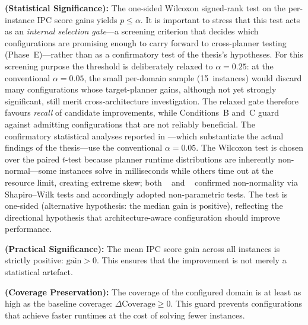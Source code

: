 \begin{description}[style=nextline, leftmargin=2.5cm, labelwidth=2.2cm]
  \item[\textbf{Condition~A}] \textbf{(Statistical Significance):}
        The one-sided Wilcoxon signed-rank test on the per-instance IPC score gains yields $p \leq \alpha$.
        It is important to stress that this test acts as an \emph{internal selection gate}---a screening criterion that decides which configurations are promising enough to carry forward to cross-planner testing (Phase~E)---rather than as a confirmatory test of the thesis's hypotheses.
        For this screening purpose the threshold is deliberately relaxed to $\alpha = 0.25$: at the conventional $\alpha = 0.05$, the small per-domain sample (15~instances) would discard many configurations whose target-planner gains, although not yet strongly significant, still merit cross-architecture investigation.
        The relaxed gate therefore favours \emph{recall} of candidate improvements, while Conditions~B and~C guard against admitting configurations that are not reliably beneficial.
        The confirmatory statistical analyses reported in ---which substantiate the actual findings of the thesis---use the conventional $\alpha = 0.05$.
        The Wilcoxon test is chosen over the paired $t$-test because planner runtime distributions are inherently non-normal---some instances solve in milliseconds while others time out at the resource limit, creating extreme skew; both \citeauthor{Elis2025}~\cite{Elis2025} and \citeauthor{Georgievski2025}~\cite{Georgievski2025} confirmed non-normality via Shapiro--Wilk tests and accordingly adopted non-parametric tests.
        The test is one-sided (alternative hypothesis: the median gain is positive), reflecting the directional hypothesis that architecture-aware configuration should improve performance.

  \item[\textbf{Condition~B}] \textbf{(Practical Significance):}
        The mean IPC score gain across all instances is strictly positive: $\overline{\text{gain}} > 0$.
        This ensures that the improvement is not merely a statistical artefact.

  \item[\textbf{Condition~C}] \textbf{(Coverage Preservation):}
        The coverage of the configured domain is at least as high as the baseline coverage: $\Delta\text{Coverage} \geq 0$.
        This guard prevents configurations that achieve faster runtimes at the cost of solving fewer instances.
\end{description}

